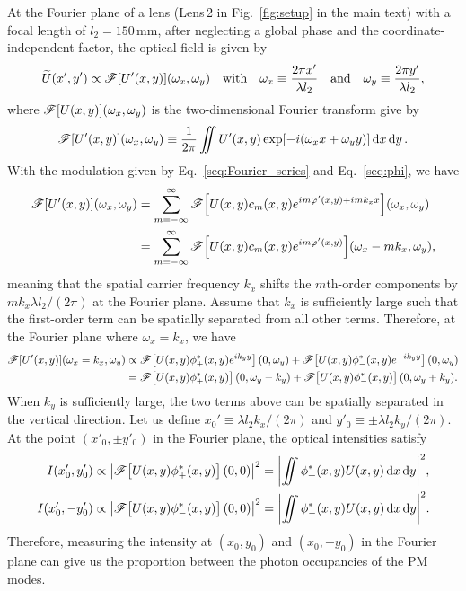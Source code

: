 \documentclass[aps,pra,10pt,showpacs,amsmath,amssymb,floatfix,superscriptaddress,twocolumn]{revtex4-2}
\begin{document}
At the Fourier plane of a lens (Lens\,2 in Fig.~\ref{fig:setup} in the main text) with a focal length of $l_2=150$\,mm,  after neglecting a global phase and the coordinate-independent factor, the optical field is given by~\cite{supp_Goodman2003}
\begin{equation}
    \widetilde U(x',y') \propto \mathscr{F}[U'(x,y)]\qty(\omega_x,\omega_y)
    \qq{with}
    \omega_x \equiv \frac{2\pi x'}{\lambda l_2} \qand \omega_y \equiv \frac{2\pi y'}{\lambda l_2},
\end{equation}
where \(\mathscr{F}[U(x,y)]\qty(\omega_x,\omega_y)\) is the two-dimensional Fourier transform give by
\begin{equation}
    \mathscr{F}[U'(x,y)]\qty(\omega_x,\omega_y)
    \equiv \frac1{2\pi} \iint U'(x,y) \exp[- i(\omega_x x + \omega_y y)] \dd{x} \dd{y}.
\end{equation}
With the modulation given by Eq.~\eqref{seq:Fourier_series} and Eq.~\eqref{seq:phi}, we have
\begin{align}
    \mathscr{F}[U'(x,y)]\qty(\omega_x,\omega_y)
    &= \sum_{m=-\infty}^\infty \mathscr{F}\qty[U(x,y) c_m(x,y) e^{im\varphi'(x,y) + i m k_x x}]\qty(\omega_x,\omega_y) \\
    &= \sum_{m=-\infty}^\infty \mathscr{F}\qty[U(x,y) c_m(x,y) e^{im\varphi'(x,y)}]\qty(\omega_x - m k_x, \omega_y),
\end{align}
meaning that the spatial carrier frequency \(k_x\) shifts the \(m\)th-order components by \(m k_x \lambda l_2 / (2\pi)\) at the Fourier plane.
Assume that \(k_x\) is sufficiently large such that the first-order term can be spatially separated from all other terms.
Therefore, at the Fourier plane where \(\omega_x = k_x\), we have
\begin{align}
    \mathscr{F}[U'(x,y)]\qty(\omega_x=k_x,\omega_y)
    &\propto  \mathscr{F}\qty[U(x,y)\phi_+^*(x,y) e^{ i k_y y}](0,\omega_y)
    + \mathscr{F}\qty[U(x,y)\phi_-^*(x,y) e^{-i k_y y}](0,\omega_y) \\
    &= \mathscr{F}\qty[U(x,y)\phi_+^*(x,y)](0,\omega_y - k_y)
    + \mathscr{F}\qty[U(x,y)\phi_-^*(x,y)](0,\omega_y + k_y).
\end{align}
When \(k_y\) is sufficiently large, the two terms above can be spatially separated in the vertical direction.
Let us define \(x_0'\equiv\lambda l_2 k_x / (2\pi)\) and \(y'_0\equiv\pm \lambda l_2 k_y / (2\pi)\).
At the point \((x'_0,\pm y'_0)\) in the Fourier plane, the optical intensities satisfy
\begin{align}
    I(x'_0, y'_0) &\propto \abs{\mathscr{F}\qty[U(x,y)\phi_+^*(x,y)](0,0)}^2
    = \abs{\iint \phi_+^*(x,y) U(x,y) \dd{x}\dd{y}}^2,  \\
    I(x'_0, -y'_0) &\propto \abs{\mathscr{F}\qty[U(x,y)\phi_-^*(x,y)](0,0)}^2
    = \abs{\iint \phi_-^*(x,y) U(x,y) \dd{x}\dd{y}}^2.
\end{align}
Therefore, measuring the intensity at \((x_0, y_0)\) and \((x_0,-y_0)\) in the Fourier plane can give us the proportion between  the photon occupancies of the PM modes.
\end{document}
